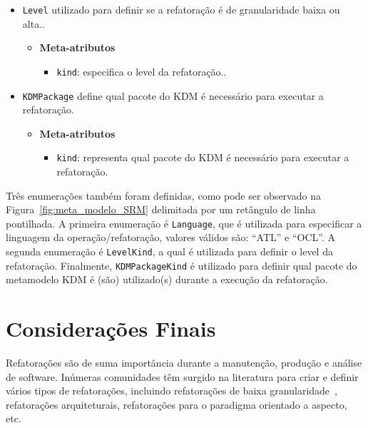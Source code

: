 \begin{itemize}
\item \texttt{Level} utilizado para definir se a refatoração é de granularidade baixa ou alta..

\begin{itemize}
	\item \textbf{Meta-atributos}
		\begin{itemize}
			\item \texttt{kind}: especifica o level da refatoração..
		\end{itemize}	
\end{itemize} 

\item \texttt{KDMPackage} define qual pacote do KDM é necessário para executar a refatoração.

\begin{itemize}
	\item \textbf{Meta-atributos}
		\begin{itemize}
			\item \texttt{kind}: representa qual pacote do KDM é necessário para executar a refatoração.
		\end{itemize}	
\end{itemize} 

\end{itemize}

Três enumerações também foram definidas, como pode ser observado na Figura~\ref{fig:meta_modelo_SRM} delimitada por um retângulo de linha pontilhada. A primeira enumeração é \texttt{Language}, que é utilizada para especificar a linguagem da operação/refatoração, valores válidos são: ``ATL'' e ``OCL''. A segunda enumeração é \texttt{LevelKind}, a qual é utilizada para definir o level da refatoração. Finalmente, \texttt{KDMPackageKind} é utilizado para definir qual pacote do metamodelo KDM é (são) utilizado(s) durante a execução da refatoração. 


\section{Considerações Finais}
\label{sec:consideracoes_finais}

Refatorações são de suma importância durante a manutenção, produção e análise de software. Inúmeras comunidades têm surgido na literatura para criar e definir vários tipos de refatorações, incluindo refatorações de baixa granularidade~\cite{Fowler1999, Demeyer1, Demeyer2}, refatorações arquiteturais, refatorações para o paradigma orientado a aspecto, etc. 

